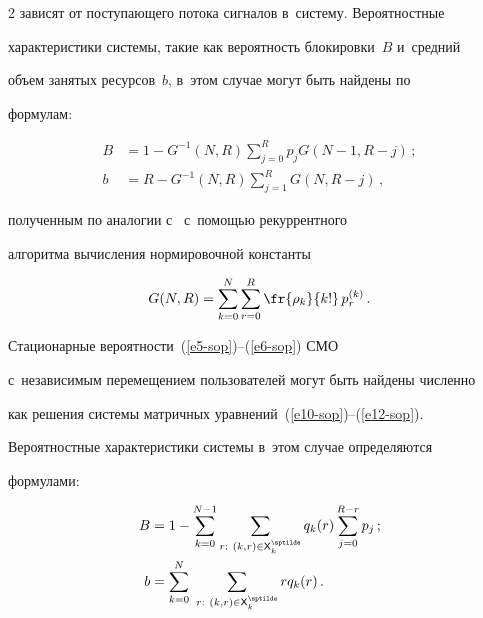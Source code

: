 \begin{multicols}{2}
зависят от поступающего потока сигналов в~систему. Вероятностные 

характеристики системы, такие как вероятность блокировки~$B$ и~средний 

объем занятых ресурсов~$b$, в~этом случае могут быть найдены по 

формулам:



\noindent

  \begin{align*}

  B &= 1-G^{-1}(N,R)\sum\limits_{j=0}^R p_j G(N-1,R-j)\,;


  \\

  b &= R-G^{-1}(N,R) \sum\limits_{j=1}^R G(N,R-j)\,, %

  \end{align*}

полученным по аналогии с~\cite{11-sop} с~по\-мощью рекуррентного 

алгоритма вычисления нормировочной константы 

$$

G(N,R)= 

\sum\limits_{k=0}^N \sum\limits_{r=0}^R \fr{\rho_k}{k!}\,p_r^{(k)}\,. 

$$



  Стационарные вероятности~(\ref{e5-sop})--(\ref{e6-sop}) СМО 

с~независимым перемещением пользователей могут быть найдены численно 

как решения системы матричных уравнений~(\ref{e10-sop})--(\ref{e12-sop}). 

Вероятностные характеристики системы в~этом случае определяются 

формулами: 



\noindent

  \begin{align*}

  B&= 1-\sum\limits_{k=0}^{N-1} \sum

  \limits_{r:\ (k,r)\in{\sf X}^{\sptilde}_k} q_k(r)\sum\limits_{j=0}^{R-r} 

p_j\,; %

\\

  b&= \sum\limits^N_{k=0} \ \sum\limits_{r:\ (k,r)\in{\sf X}^{\sptilde}_k} rq_k(r)\,.


\end{align*}
\end{multicols}
